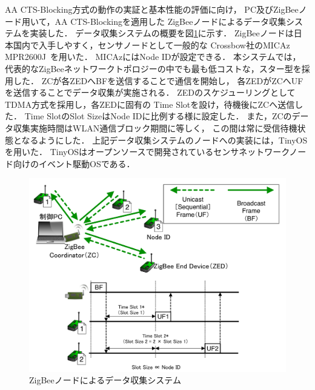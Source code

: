 \documentclass[technicalreport]{ieicej}
\begin{document}
AA CTS-Blocking方式の動作の実証と基本性能の評価に向け，
PC及びZigBeeノード用いて，AA CTS-Blockingを適用した
ZigBeeノードによるデータ収集システムを実装した．
データ収集システムの概要を図\ref{fig:aacts_snw}に示す．
ZigBeeノードは日本国内で入手しやすく，センサノードとして一般的な
Crossbow社のMICAz MPR2600J~\cite{Device:}を用いた．
MICAzにはNode IDが設定できる．
本システムでは，
代表的なZigBeeネットワークトポロジーの中でも最も低コストな，スター型を採用した．
ZCが各ZEDへBFを送信することで通信を開始し，
各ZEDがZCへUFを送信することでデータ収集が実施される．
ZEDのスケジューリングとしてTDMA方式を採用し，各ZEDに固有の
Time Slotを設け，待機後にZCへ送信した．
Time SlotのSlot SizeはNode IDに比例する様に設定した．
また，ZCのデータ収集実施時間はWLAN通信ブロック期間に等しく，
この間は常に受信待機状態となるようにした．
上記データ収集システムのノードへの実装には，TinyOSを用いた．
TinyOSはオープンソースで開発されているセンサネットワークノード向けのイベント駆動OSである．

\begin{figure}[bt]
 \centering
 \includegraphics[width=\columnwidth]{figure/aacts_snw.pdf}
 \caption{ZigBeeノードによるデータ収集システム}
 \label{fig:aacts_snw}
\end{figure}
\end{document}
